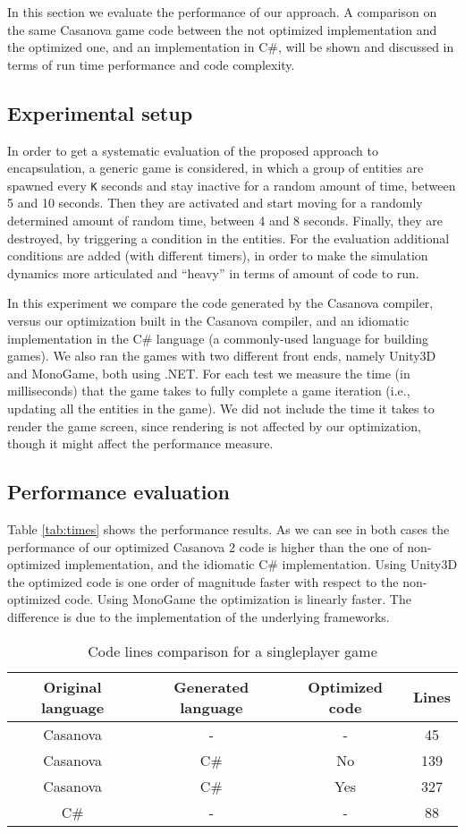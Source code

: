 In this section we evaluate the performance of our approach. A comparison on the same Casanova game code between the not optimized implementation and the optimized one, and an implementation in C\#, will be shown and discussed in terms of run time performance and code complexity.

\subsection{Experimental setup} In order to get a systematic evaluation of the proposed approach to encapsulation, a generic game is considered, in which a group of entities are spawned every \texttt{K} seconds and stay inactive for a random amount of time, between 5 and 10 seconds. Then they are activated and start moving for a randomly determined amount of random time, between 4 and 8 seconds. Finally, they are destroyed, by triggering a condition in the entities. For the evaluation additional conditions are added (with different timers), in order to make the simulation dynamics more articulated and ``heavy'' in terms of amount of code to run.


In this experiment we compare the code generated by the Casanova compiler, versus our optimization built in the Casanova compiler, and an idiomatic implementation in the C\# language (a commonly-used language for building games). We also ran the games with two different front ends, namely Unity3D and MonoGame, both using .NET.
For each test we measure the time (in milliseconds) that the game takes to fully complete a game iteration (i.e., updating all the entities in the game). We did not include the time it takes to render the game screen, since rendering is not affected by our optimization, though it might affect the performance measure.
\subsection{Performance evaluation} Table \ref{tab:times} shows the performance results. As we can see in both cases the performance of our optimized Casanova 2 code is higher than the one of non-optimized implementation, and the idiomatic C\# implementation. Using Unity3D the optimized code is one order of magnitude faster with respect to the non-optimized code. Using MonoGame the optimization is linearly faster. The difference is due to the implementation of the underlying frameworks.

\begin{table}[!ht]
\caption{Code lines comparison for a singleplayer game}
\label{tab:length}
\centering
\begin{tabular}{ @{}|c|c|c|c|@{} }
\hline
  Original language & Generated language & Optimized code & Lines \\ \hline
  Casanova & - & - & 45 \\
  Casanova & C\# & No & 139 \\
  Casanova & C\# & Yes & 327 \\
  C\# & - & - & 88 \\ \hline
\hline
\end{tabular}
\end{table}

